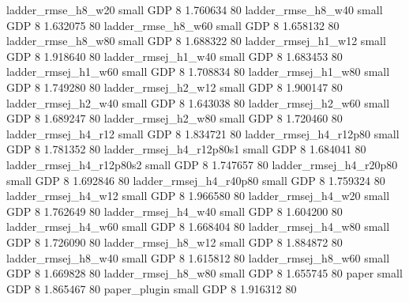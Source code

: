       ladder_rmse_h8_w20      small      GDP                 8 1.760634 80
      ladder_rmse_h8_w40      small      GDP                 8 1.632075 80
      ladder_rmse_h8_w60      small      GDP                 8 1.658132 80
      ladder_rmse_h8_w80      small      GDP                 8 1.688322 80
     ladder_rmsej_h1_w12      small      GDP                 8 1.918640 80
     ladder_rmsej_h1_w40      small      GDP                 8 1.683453 80
     ladder_rmsej_h1_w60      small      GDP                 8 1.708834 80
     ladder_rmsej_h1_w80      small      GDP                 8 1.749280 80
     ladder_rmsej_h2_w12      small      GDP                 8 1.900147 80
     ladder_rmsej_h2_w40      small      GDP                 8 1.643038 80
     ladder_rmsej_h2_w60      small      GDP                 8 1.689247 80
     ladder_rmsej_h2_w80      small      GDP                 8 1.720460 80
     ladder_rmsej_h4_r12      small      GDP                 8 1.834721 80
  ladder_rmsej_h4_r12p80      small      GDP                 8 1.781352 80
ladder_rmsej_h4_r12p80s1      small      GDP                 8 1.684041 80
ladder_rmsej_h4_r12p80s2      small      GDP                 8 1.747657 80
  ladder_rmsej_h4_r20p80      small      GDP                 8 1.692846 80
  ladder_rmsej_h4_r40p80      small      GDP                 8 1.759324 80
     ladder_rmsej_h4_w12      small      GDP                 8 1.966580 80
     ladder_rmsej_h4_w20      small      GDP                 8 1.762649 80
     ladder_rmsej_h4_w40      small      GDP                 8 1.604200 80
     ladder_rmsej_h4_w60      small      GDP                 8 1.668404 80
     ladder_rmsej_h4_w80      small      GDP                 8 1.726090 80
     ladder_rmsej_h8_w12      small      GDP                 8 1.884872 80
     ladder_rmsej_h8_w40      small      GDP                 8 1.615812 80
     ladder_rmsej_h8_w60      small      GDP                 8 1.669828 80
     ladder_rmsej_h8_w80      small      GDP                 8 1.655745 80
                   paper      small      GDP                 8 1.865467 80
            paper_plugin      small      GDP                 8 1.916312 80